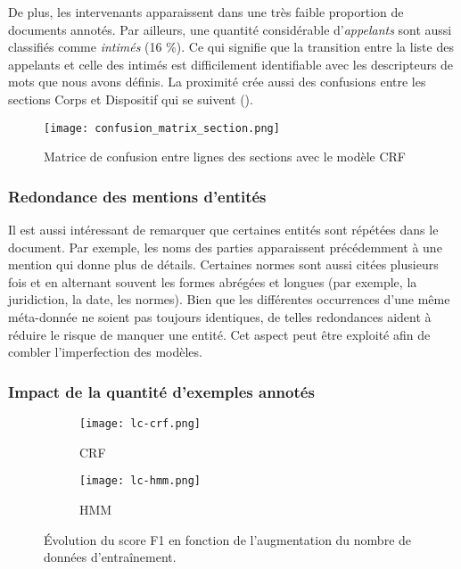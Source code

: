 De plus, les intervenants apparaissent dans une très faible proportion de documents annotés.  Par ailleurs, une quantité considérable d'\textit{appelants} sont aussi classifiés comme \textit{intimés} (16 \%).  Ce qui signifie que la transition entre la liste des appelants et celle des intimés est difficilement identifiable avec les descripteurs de mots que nous avons définis. La proximité crée aussi des confusions entre les sections Corps et Dispositif qui se suivent (). 

\begin{figure}[!htb]
	\centering
	\texttt{[image: confusion\_matrix\_section.png]}
	\caption{Matrice de confusion entre lignes des sections avec le modèle CRF}
	\label{fig:structuration:matrice-confusion-section}
\end{figure}

\subsubsection{Redondance des mentions d'entités}
Il est aussi intéressant de remarquer que certaines entités sont répétées dans le document. Par exemple, les noms des parties apparaissent précédemment à une mention qui donne plus de détails. Certaines normes sont aussi citées plusieurs fois et en alternant souvent les formes abrégées et longues (par exemple, la juridiction, la date, les normes). Bien que les différentes occurrences d'une même méta-donnée ne soient pas toujours identiques, de telles redondances aident à réduire le risque de manquer une entité. Cet aspect peut être exploité afin de combler l'imperfection des modèles.


\subsubsection{Impact de la quantité d'exemples annotés}

\begin{figure}[!htb]
	\centering
	\begin{subfigure}[ht]{\textwidth}
		\centering
		\texttt{[image: lc-crf.png]} 
		\caption{CRF} \label{fig:structuration:learning-curves-crf}
	\end{subfigure} 
	
	\begin{subfigure}[ht]{\textwidth}
		\centering
		\texttt{[image: lc-hmm.png]}
		\caption{HMM} \label{fig:structuration:learning-curves-hmm}
	\end{subfigure}
	\caption{Évolution du score F1 en fonction de l'augmentation du nombre de données d'entraînement.} \label{fig:structuration:learning-curves}
\end{figure}

